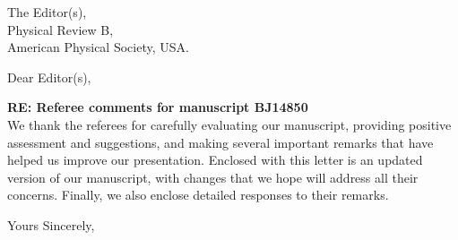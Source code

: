 \documentclass[a4paper, 10pt]{letter}
\begin{document}
	
	\begin{letter}
		{
			The Editor(s),\\
			Physical Review B,\\
			American Physical Society, USA.
		}
		
		\opening{Dear Editor(s),}
		\bigskip
		\textbf{RE: Referee comments for manuscript BJ14850}
		\bigskip\noindent\\
		We thank the referees for carefully evaluating our manuscript, providing positive assessment and suggestions, and making several important remarks that have helped us improve our presentation. Enclosed with this letter is an updated version of our manuscript, with changes that we hope will address all their concerns. Finally, we also enclose detailed responses to their remarks.
		
		
		\closing{Yours Sincerely,}
		
	\end{letter}
\end{document}
